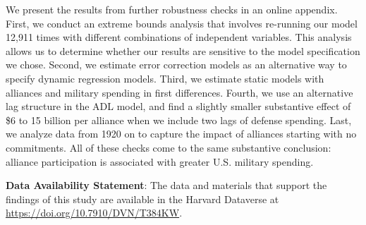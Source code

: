 \documentclass[12pt,hidelinks]{article}
\begin{document}
We present the results from further robustness checks in an online appendix. 
First, we conduct an extreme bounds analysis that involves re-running our model 12,911 times with different combinations of independent variables.
This analysis allows us to determine whether our results are sensitive to the model specification we chose.
Second, we estimate error correction models as an alternative way to specify dynamic regression models.
Third, we estimate static models with alliances and military spending in first differences.
Fourth, we use an alternative lag structure in the ADL model, and find a slightly smaller substantive effect of \$6 to 15 billion per alliance when we include two lags of defense spending. 
Last, we analyze data from 1920 on to capture the impact of alliances starting with no commitments. 
All of these checks come to the same substantive conclusion: alliance participation is associated with greater U.S. military spending.




\vspace{15mm} 
\textbf{Data Availability Statement}: The data and materials that support the findings of this study are available in the Harvard Dataverse at \url{https://doi.org/10.7910/DVN/T384KW}. 



 
%
\end{document}
